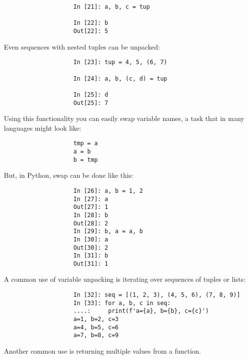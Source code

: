 \documentclass{article}
\begin{document}
\begin{itemize}
\begin{itemize}
\begin{itemize}
\begin{itemize}
\begin{verbatim}
					In [21]: a, b, c = tup
					
					In [22]: b
					Out[22]: 5
				\end{verbatim}
				Even sequences with nested tuples can be unpacked:
				\begin{verbatim}
					In [23]: tup = 4, 5, (6, 7)
					
					In [24]: a, b, (c, d) = tup
					
					In [25]: d
					Out[25]: 7
				\end{verbatim}
				Using this functionality you can easily swap variable names, a task that in many languages might look like:
				\begin{verbatim}
					tmp = a
					a = b
					b = tmp
				\end{verbatim}
				But, in Python, swap can be done like this:
				\begin{verbatim}
					In [26]: a, b = 1, 2
					In [27]: a
					Out[27]: 1
					In [28]: b
					Out[28]: 2
					In [29]: b, a = a, b
					In [30]: a
					Out[30]: 2
					In [31]: b
					Out[31]: 1
				\end{verbatim}
				A common use of variable unpacking is iterating over sequences of tuples or lists:
				\begin{verbatim}
					In [32]: seq = [(1, 2, 3), (4, 5, 6), (7, 8, 9)]
					In [33]: for a, b, c in seq:
					....:     print(f'a={a}, b={b}, c={c}')
					a=1, b=2, c=3
					a=4, b=5, c=6
					a=7, b=8, c=9
				\end{verbatim}
				Another common use is returning multiple values from a function.
				

\end{itemize}
\end{itemize}
\end{itemize}
\end{itemize}
\end{document}
